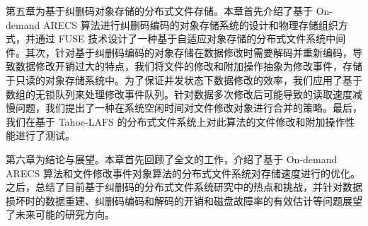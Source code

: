 第五章为基于纠删码对象存储的分布式文件存储。本章首先介绍了基于 On-demand ARECS 算法进行纠删码编码的对象存储系统的设计和物理存储组织方式，并通过 FUSE 技术设计了一种基于自适应对象存储的分布式文件系统中间件。其次，针对基于纠删码编码的对象存储在数据修改时需要解码并重新编码，导致数据修改开销过大的特点，我们将文件的修改和附加操作抽象为修改事件，存储于只读的对象存储系统中。为了保证并发状态下数据修改的效率，我们应用了基于数组的无锁队列来处理修改事件队列。针对数据多次修改后可能导致的读取速度减慢问题，我们提出了一种在系统空闲时间对文件修改对象进行合并的策略。最后，我们在基于 Tahoe-LAFS 的分布式文件系统上对此算法的文件修改和附加操作性能进行了测试。

第六章为结论与展望。本章首先回顾了全文的工作，介绍了基于 On-demand ARECS 算法和文件修改事件对象算法的分布式文件系统对存储速度进行的优化。之后，总结了目前基于纠删码的分布式文件系统研究中的热点和挑战，并针对数据损坏时的数据重建、纠删码编码和解码的开销和磁盘故障率的有效估计等问题展望了未来可能的研究方向。

